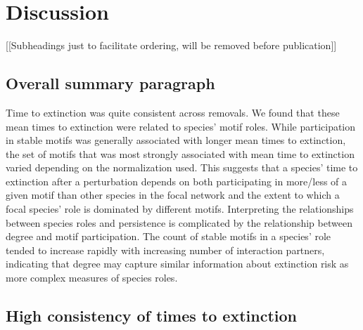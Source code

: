 \documentclass[12pt]{article}
\begin{document}
\section{Discussion}

	[[Subheadings just to facilitate ordering, will be removed before publication]]


	\subsection*{Overall summary paragraph}

		Time to extinction was quite consistent across removals. 
		We found that these mean times to extinction were related to species' motif roles.
		While participation in stable motifs was generally associated with longer mean times to extinction, the set of motifs that was most strongly associated with mean time to extinction varied depending on the normalization used.
		This suggests that a species' time to extinction after a perturbation depends on both participating in more/less of a given motif than other species in the focal network and the extent to which a focal species' role is dominated by different motifs.
		Interpreting the relationships between species roles and persistence is complicated by the relationship between degree and motif participation.
		The count of stable motifs in a species' role tended to increase rapidly with increasing number of interaction partners, indicating that degree may capture similar information about extinction risk as more complex measures of species roles.



 	\subsection*{High consistency of times to extinction}
\end{document}
